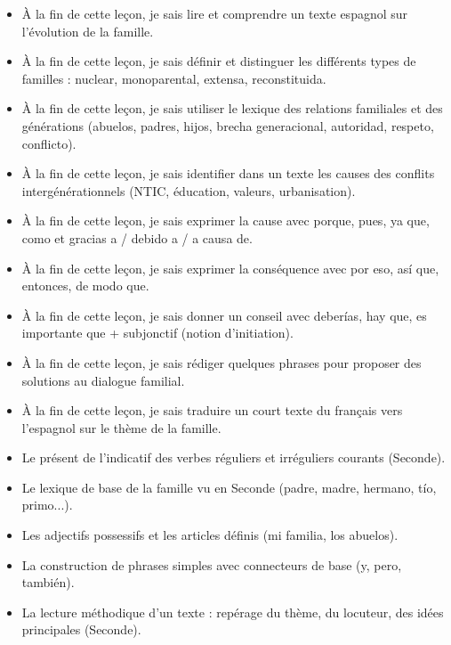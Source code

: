 \documentclass[11pt]{article}
\begin{document}
\begin{objectifs}
\begin{itemize}
\item À la fin de cette leçon, je sais lire et comprendre un texte espagnol sur l'évolution de la famille.
\item À la fin de cette leçon, je sais définir et distinguer les différents types de familles : nuclear, monoparental, extensa, reconstituida.
\item À la fin de cette leçon, je sais utiliser le lexique des relations familiales et des générations (abuelos, padres, hijos, brecha generacional, autoridad, respeto, conflicto).
\item À la fin de cette leçon, je sais identifier dans un texte les causes des conflits intergénérationnels (NTIC, éducation, valeurs, urbanisation).
\item À la fin de cette leçon, je sais exprimer la cause avec porque, pues, ya que, como et gracias a / debido a / a causa de.
\item À la fin de cette leçon, je sais exprimer la conséquence avec por eso, así que, entonces, de modo que.
\item À la fin de cette leçon, je sais donner un conseil avec deberías, hay que, es importante que + subjonctif (notion d'initiation).
\item À la fin de cette leçon, je sais rédiger quelques phrases pour proposer des solutions au dialogue familial.
\item À la fin de cette leçon, je sais traduire un court texte du français vers l'espagnol sur le thème de la famille.
\end{itemize}
\end{objectifs}

\begin{prerequis}
\begin{itemize}
\item Le présent de l'indicatif des verbes réguliers et irréguliers courants (Seconde).
\item Le lexique de base de la famille vu en Seconde (padre, madre, hermano, tío, primo...).
\item Les adjectifs possessifs et les articles définis (mi familia, los abuelos).
\item La construction de phrases simples avec connecteurs de base (y, pero, también).
\item La lecture méthodique d'un texte : repérage du thème, du locuteur, des idées principales (Seconde).
\end{itemize}
\end{prerequis}
\end{document}
